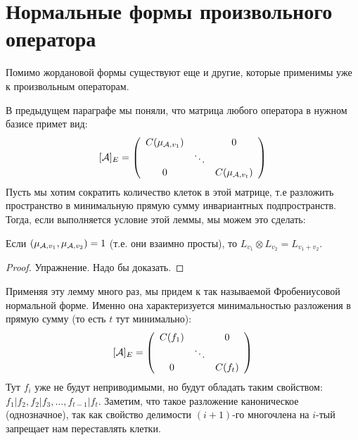 \section{Нормальные формы произвольного оператора}
Помимо жордановой формы существуют еще и другие, которые применимы уже к произвольным операторам.

В предыдущем параграфе мы поняли, что матрица любого оператора в нужном базисе примет вид:
\[
  [ \mathcal{A} ]_{E} = \left(\begin{array}{ccc}
  C(\mu_{\mathcal{A}, v_1}) &  & 0 \\ 
   & \ddots &  \\ 
  0 &  & C(\mu_{\mathcal{A}, v_t})
  \end{array}\right)  
\]
Пусть мы хотим сократить количество клеток в этой матрице, т.е разложить пространство в минимальную прямую сумму инвариантных подпространств.
Тогда, если выполняется условие этой леммы, мы можем это сделать:
\begin{lemma}
    Если $(\mu_{\mathcal{A}, v_1}, \mu_{\mathcal{A}, v_2}) = 1$ (т.е. они взаимно просты), то $L_{v_1} \otimes L_{v_2} = L_{v_1 + v_2}$.
\end{lemma}
\begin{proof}
    Упражнение. Надо бы доказать.
\end{proof}

Применяя эту лемму много раз, мы придем к так называемой Фробениусовой нормальной форме.
Именно она характеризуется минимальностью разложения в прямую сумму (то есть $t$ тут минимально):
    \[
  [ \mathcal{A} ]_{E} = \left(\begin{array}{ccc}
  C(f_1) &  & 0 \\ 
   & \ddots &  \\ 
  0 &  & C(f_t)
  \end{array}\right)  
\]
Тут $f_i$ уже не будут неприводимыми, но будут обладать таким свойством: $f_1 | f_2, f_2 | f_3, \dots, f_{t - 1} | f_t$.
Заметим, что такое разложение каноническое (однозначное), так как свойство делимости $(i + 1)$-го многочлена на $i$-тый запрещает нам переставлять клетки.

